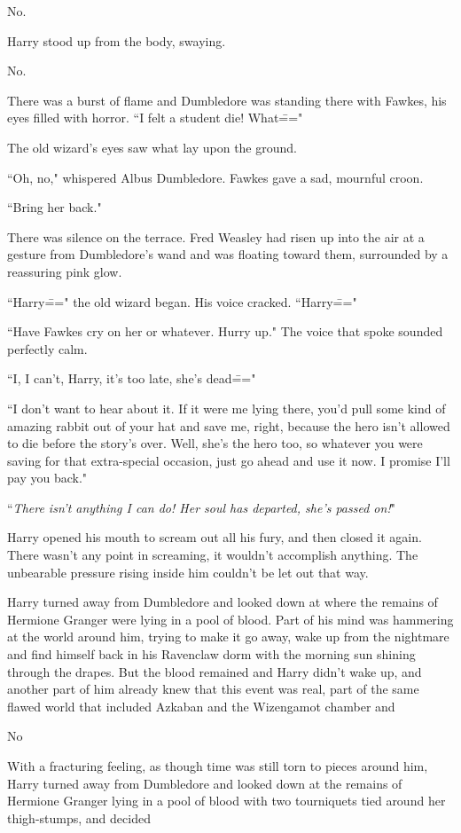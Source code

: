 No.

Harry stood up from the body, swaying.

No.

There was a burst of flame and Dumbledore was standing there with Fawkes, his eyes filled with horror. ``I felt a student die! What\==="

The old wizard's eyes saw what lay upon the ground.

``Oh, no," whispered Albus Dumbledore. Fawkes gave a sad, mournful croon.

``Bring her back."

There was silence on the terrace. Fred Weasley had risen up into the air at a gesture from Dumbledore's wand and was floating toward them, surrounded by a reassuring pink glow.

``Harry\===" the old wizard began. His voice cracked. ``Harry\==="

``Have Fawkes cry on her or whatever. Hurry up." The voice that spoke sounded perfectly calm.

``I, I can't, Harry, it's too late, she's dead\==="

``I don't want to hear about it. If it were me lying there, you'd pull some kind of amazing rabbit out of your hat and save me, right, because the hero isn't allowed to die before the story's over. Well, she's the hero too, so whatever you were saving for that extra-special occasion, just go ahead and use it now. I promise I'll pay you back."

``\emph{There isn't anything I can do! Her soul has departed, she's passed on!}"

Harry opened his mouth to scream out all his fury, and then closed it again. There wasn't any point in screaming, it wouldn't accomplish anything. The unbearable pressure rising inside him couldn't be let out that way.

Harry turned away from Dumbledore and looked down at where the remains of Hermione Granger were lying in a pool of blood. Part of his mind was hammering at the world around him, trying to make it go away, wake up from the nightmare and find himself back in his Ravenclaw dorm with the morning sun shining through the drapes. But the blood remained and Harry didn't wake up, and another part of him already knew that this event was real, part of the same flawed world that included Azkaban and the Wizengamot chamber and

No

With a fracturing feeling, as though time was still torn to pieces around him, Harry turned away from Dumbledore and looked down at the remains of Hermione Granger lying in a pool of blood with two tourniquets tied around her thigh-stumps, and decided

